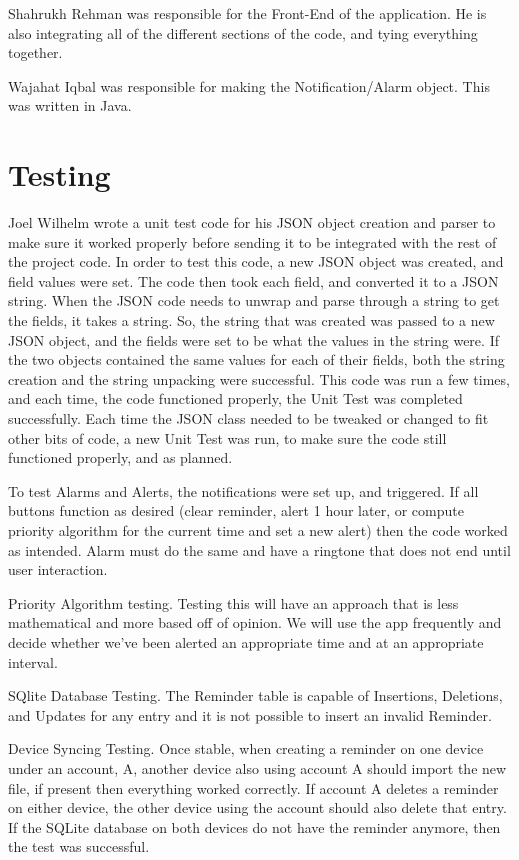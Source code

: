 \documentclass[12pt]{article}
\begin{document}
Shahrukh Rehman was responsible for the Front-End of the application. He is also integrating all of the different sections of the code, and tying everything together.

Wajahat Iqbal was responsible for making the Notification/Alarm object. This was written in Java.

\section{Testing}

Joel Wilhelm wrote a unit test code for his JSON object creation and parser to make sure it worked properly before sending it to be integrated with the rest of the project code. In order to test this code, a new JSON object was created, and field values were set. The code then took each field, and converted it to a JSON string. When the JSON code needs to unwrap and parse through a string to get the fields, it takes a string. So, the string that was created was passed to a new JSON object, and the fields were set to be what the values in the string were. If the two objects contained the same values for each of their fields, both the string creation and the string unpacking were successful. This code was run a few times, and each time, the code functioned properly, the Unit Test was completed successfully. Each time the JSON class needed to be tweaked or changed to fit other bits of code, a new Unit Test was run, to make sure the code still functioned properly, and as planned.

To test Alarms and Alerts, the notifications were set up, and triggered. If all buttons function as desired (clear reminder,  alert 1 hour later, or compute priority algorithm for the current time and set a new alert) then the code worked as intended. Alarm must do the same and have a ringtone that does not end until user interaction.

Priority Algorithm testing. Testing this will have an approach that is less mathematical and more based off of opinion. We will use the app frequently and decide whether we've been alerted an appropriate time and at an appropriate interval. 

SQlite Database Testing. The Reminder table is capable of Insertions, Deletions, and Updates for any entry and it is not possible to insert an invalid Reminder.

Device Syncing Testing. Once stable, when creating a reminder on one device under an account, A, another device also using account A should import the new file, if present then everything worked correctly. If account A deletes a reminder on either device, the other device using the account should also delete that entry. If the SQLite database on both devices do not have the reminder anymore, then the test was successful.
\end{document}
